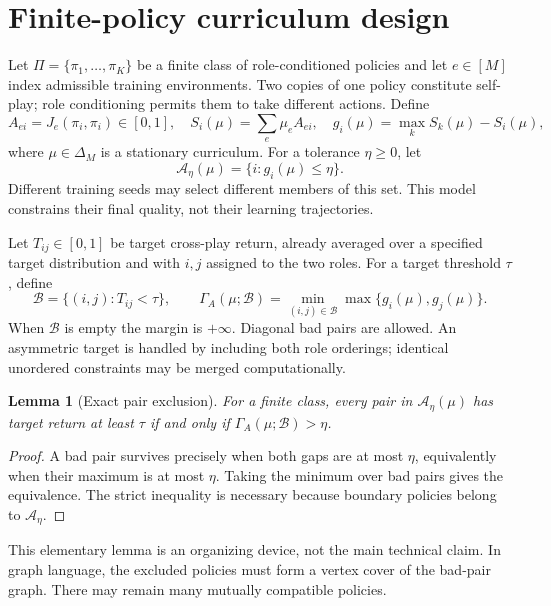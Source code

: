 \documentclass[11pt]{article}
\newtheorem{lemma}[theorem]{Lemma}
\theoremstyle{definition}\newtheorem{definition}[theorem]{Definition}
\newcommand{\1}{\mathbf{1}}
\newcommand{\simplex}{\Delta_M}
\newcommand{\bad}{\mathcal B}
\newcommand{\nearset}{\mathcal A}
\newcommand{\Gam}{\Gamma}
\begin{document}
\section{Finite-policy curriculum design}
Let $\Pi=\{\pi_1,\ldots,\pi_K\}$ be a finite class of role-conditioned policies and let $e\in[M]$ index admissible training environments. Two copies of one policy constitute self-play; role conditioning permits them to take different actions. Define
\begin{equation}
 A_{ei}=J_e(\pi_i,\pi_i)\in[0,1],\quad
 S_i(\mu)=\sum_e\mu_e A_{ei},\quad
 g_i(\mu)=\max_k S_k(\mu)-S_i(\mu),
 \label{eq:scores}
\end{equation}
where $\mu\in\simplex$ is a stationary curriculum. For a tolerance $\eta\geq0$, let
\begin{equation}
 \nearset_\eta(\mu)=\{i:g_i(\mu)\leq\eta\}.
\end{equation}
Different training seeds may select different members of this set. This model constrains their final quality, not their learning trajectories.

Let $T_{ij}\in[0,1]$ be target cross-play return, already averaged over a specified target distribution and with $i,j$ assigned to the two roles. For a target threshold $\tau$, define
\begin{equation}
 \bad=\{(i,j):T_{ij}<\tau\},\qquad
 \Gam_A(\mu;\bad)=\min_{(i,j)\in\bad}\max\{g_i(\mu),g_j(\mu)\}.
 \label{eq:margin}
\end{equation}
When $\bad$ is empty the margin is $+\infty$. Diagonal bad pairs are allowed. An asymmetric target is handled by including both role orderings; identical unordered constraints may be merged computationally.

\begin{lemma}[Exact pair exclusion]\label{lem:margin}
For a finite class, every pair in $\nearset_\eta(\mu)$ has target return at least $\tau$ if and only if $\Gam_A(\mu;\bad)>\eta$.
\end{lemma}
\begin{proof}
A bad pair survives precisely when both gaps are at most $\eta$, equivalently when their maximum is at most $\eta$. Taking the minimum over bad pairs gives the equivalence. The strict inequality is necessary because boundary policies belong to $\nearset_\eta$.
\end{proof}
This elementary lemma is an organizing device, not the main technical claim. In graph language, the excluded policies must form a vertex cover of the bad-pair graph. There may remain many mutually compatible policies.
\end{document}
